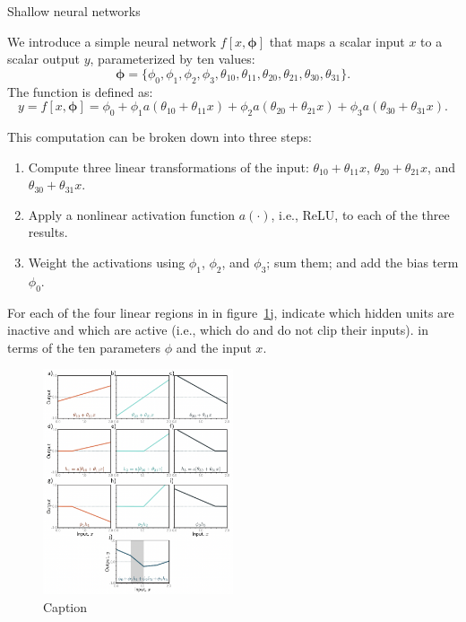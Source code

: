 \documentclass[twoside]{article}
\begin{document}
\newpage




\begin{problem} {Shallow neural networks}

We introduce a simple neural network \( f[x, \boldsymbol{\phi}] \) that maps a scalar input \( x \) to a scalar output \( y \), parameterized by ten values:
\[
\boldsymbol{\phi} = \{\phi_0, \phi_1, \phi_2, \phi_3, \theta_{10}, \theta_{11}, \theta_{20}, \theta_{21}, \theta_{30}, \theta_{31}\}.
\]
The function is defined as:
\[
y = f[x, \boldsymbol{\phi}] = \phi_0 + \phi_1 a(\theta_{10} + \theta_{11}x) + \phi_2 a(\theta_{20} + \theta_{21}x) + \phi_3 a(\theta_{30} + \theta_{31}x). \tag{3.1}
\]

This computation can be broken down into three steps:
\begin{enumerate}
    \item Compute three linear transformations of the input: \(\theta_{10} + \theta_{11}x\), \(\theta_{20} + \theta_{21}x\), and \(\theta_{30} + \theta_{31}x\).
    \item Apply a nonlinear activation function \( a(\cdot) \), i.e., ReLU, to each of the three results.
    \item Weight the activations using \(\phi_1\), \(\phi_2\), and \(\phi_3\); sum them; and add the bias term \(\phi_0\).
\end{enumerate}




\begin{question}[8] For each of the four linear regions in in figure~\ref{fig:shallow}j, indicate which hidden units are
inactive and which are active (i.e., which do and do not clip their inputs). 
in terms of the ten parameters $\phi$ and the input $x$. 
\begin{figure}[htbp]
    \centering
    \includegraphics[width=0.5\textwidth]{shallow.png}
    \caption{Caption}
    \label{fig:shallow}
\end{figure}


\end{question}
\end{problem}
\end{document}
